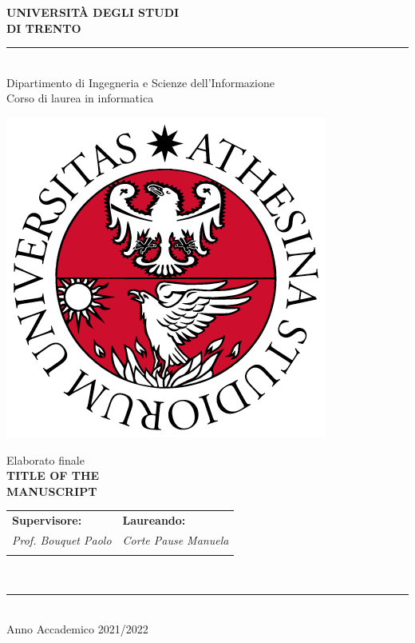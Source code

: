 \documentclass[a4paper,12pt,openright,notitlepage,twoside]{book}
\begin{document}
\thispagestyle{empty} 	%
\begin{center}
{\LARGE \bf UNIVERSITÀ DEGLI STUDI}\\ \vspace{0.25cm}
{\LARGE \bf  DI TRENTO}
\vspace{-2mm}\rule{\textwidth}{0.4pt}\\[0.5cm]

{\Large Dipartimento di Ingegneria e Scienze dell'Informazione}\\[5pt]
{\Large Corso di laurea in informatica }\\[0.8cm]

\begin{center}
	\includegraphics[scale = 0.35]{logo.png}
\end{center}

\vspace{1.7cm}
{\Large  Elaborato finale}\\[1cm] 
{\Large \bf TITLE OF THE}\\ \vspace{0.25cm}
{\Large \bf MANUSCRIPT}\\[3cm] 


\centering
\begin{tabular}{ll}
	\textbf{Supervisore:}      			\hspace{3cm}       	& \textbf{Laureando:}\\[5pt]
    \textit{Prof. Bouquet Paolo}     \hspace{5cm}       	& \textit{Corte Pause Manuela}\\[2pt]
															&
\end{tabular}\\
\vfill
\rule{\textwidth}{0.4pt}\\[5pt]

{\large Anno Accademico 2021/2022}\\[0.2cm]
\end{center}
\end{document}
